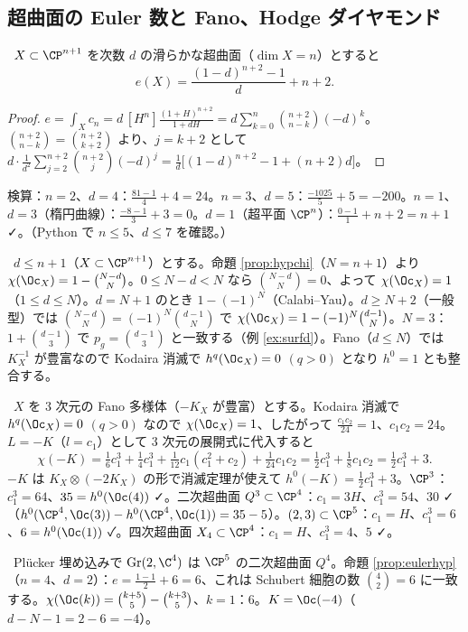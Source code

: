 \subsection{超曲面の Euler 数と Fano、Hodge ダイヤモンド}
\begin{prop}\label{prop:eulerhyp}\tP\
$X\subset\CP^{n+1}$ を次数 $d$ の滑らかな超曲面（$\dim X=n$）とすると
\[
e(X)=\frac{(1-d)^{n+2}-1}d+n+2.
\]
\end{prop}
\begin{proof}
$e=\int_Xc_n=d\,[H^n]\frac{(1+H)^{n+2}}{1+dH}=d\sum_{k=0}^n\binom{n+2}{n-k}(-d)^k$。$\binom{n+2}{n-k}=\binom{n+2}{k+2}$ より、$j=k+2$ として $d\cdot\frac1{d^2}\sum_{j=2}^{n+2}\binom{n+2}j(-d)^j=\frac1d\bigl[(1-d)^{n+2}-1+(n+2)d\bigr]$。
\end{proof}
\noindent 検算：$n=2$、$d=4$：$\frac{81-1}4+4=24$。$n=3$、$d=5$：$\frac{-1025}5+5=-200$。$n=1$、$d=3$（楕円曲線）：$\frac{-8-1}3+3=0$。$d=1$（超平面 $\CP^n$）：$\frac{0-1}1+n+2=n+1$ ✓。（Python で $n\le5$、$d\le7$ を確認。）
\begin{ex}[Fano 超曲面：$\chi(\Oc_X)=1$]\label{ex:Fano}\tP\
$d\le n+1$（$X\subset\CP^{n+1}$）とする。命題 \ref{prop:hypchi}（$N=n+1$）より $\chi(\Oc_X)=1-\binom{N-d}N$。$0\le N-d<N$ なら $\binom{N-d}N=0$、よって $\chi(\Oc_X)=1$（$1\le d\le N$）。$d=N+1$ のとき $1-(-1)^N$（Calabi--Yau）。$d\ge N+2$（一般型）では $\binom{N-d}N=(-1)^N\binom{d-1}N$ で $\chi(\Oc_X)=1-(-1)^N\binom{d-1}N$。$N=3$：$1+\binom{d-1}3$ で $p_g=\binom{d-1}3$ と一致する（例 \ref{ex:surfd}）。Fano（$d\le N$）では $K_X^{-1}$ が豊富なので Kodaira 消滅で $h^q(\Oc_X)=0$ $(q>0)$ となり $h^0=1$ とも整合する。
\end{ex}

\begin{ex}[Fano 3 次元：$h^0(-K)=\frac12c_1^3+3$]\label{ex:Fano3}\tP\
$X$ を 3 次元の Fano 多様体（$-K_X$ が豊富）とする。Kodaira 消滅で $h^q(\Oc_X)=0$ $(q>0)$ なので $\chi(\Oc_X)=1$、したがって $\frac{c_1c_2}{24}=1$、$c_1c_2=24$。$L=-K$（$l=c_1$）として 3 次元の展開式に代入すると
\[
\chi(-K)=\tfrac16c_1^3+\tfrac14c_1^3+\tfrac1{12}c_1(c_1^2+c_2)+\tfrac1{24}c_1c_2=\tfrac12c_1^3+\tfrac18c_1c_2=\tfrac12c_1^3+3.
\]
$-K$ は $K_X\otimes(-2K_X)$ の形で消滅定理が使えて $h^0(-K)=\frac12c_1^3+3$。$\CP^3$：$c_1^3=64$、$35=h^0(\Oc(4))$ ✓。二次超曲面 $Q^3\subset\CP^4$：$c_1=3H$、$c_1^3=54$、$30$ ✓（$h^0(\CP^4,\Oc(3))-h^0(\CP^4,\Oc(1))=35-5$）。$(2,3)\subset\CP^5$：$c_1=H$、$c_1^3=6$、$6=h^0(\Oc(1))$ ✓。四次超曲面 $X_4\subset\CP^4$：$c_1=H$、$c_1^3=4$、$5$ ✓。
\end{ex}
\begin{ex}[$\mathrm{Gr}(2,4)$]\label{ex:Gr24}\tC\
Plücker 埋め込みで $\mathrm{Gr}(2,\C^4)$ は $\CP^5$ の二次超曲面 $Q^4$。命題 \ref{prop:eulerhyp}（$n=4$、$d=2$）：$e=\frac{1-1}2+6=6$、これは Schubert 細胞の数 $\binom42=6$ に一致する。$\chi(\Oc(k))=\binom{k+5}5-\binom{k+3}5$、$k=1$：$6$。$K=\Oc(-4)$（$d-N-1=2-6=-4$）。
\end{ex}

